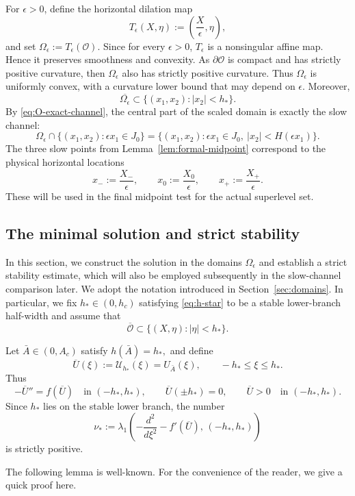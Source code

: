\documentclass[reqno,12pt]{amsart}
\numberwithin{equation}{section}
\theoremstyle{remark}
\begin{document}
For $\epsilon>0$, define the horizontal dilation map
$$
T_\epsilon(X,\eta):=\left(\frac{X}{\epsilon},\eta\right),
$$
and set $\Omega_\epsilon:=T_\epsilon(\mathcal O).$
Since for every $\epsilon>0$, $T_\epsilon$ is a nonsingular affine map. Hence it preserves smoothness and  convexity. As $\partial \mathcal O$ is compact and has strictly positive curvature, then $\Omega_\epsilon$ also has strictly positive curvature. Thus $\Omega_\epsilon$ is uniformly convex, with a curvature lower bound that may depend on $\epsilon$. 
Moreover,
$$
\overline{\Omega_\epsilon}
\subset
\{(x_1,x_2): |x_2|<h_*\}.
$$
By \eqref{eq:O-exact-channel}, the central part of the scaled domain is exactly the slow channel:
$$
\Omega_\epsilon\cap\{(x_1,x_2):\epsilon x_1\in J_0\}
=\{(x_1,x_2):\epsilon x_1\in J_0,\ |x_2|<H(\epsilon x_1)\}.
$$
The three slow points from Lemma~\ref{lem:formal-midpoint} correspond to the
physical horizontal locations
$$
x_-:=\frac{X_-}{\epsilon}, \qquad
x_0:=\frac{X_0}{\epsilon}, \qquad
x_+:=\frac{X_+}{\epsilon}.
$$
These will be used in the final midpoint test for the actual superlevel set.


\subsection{The minimal solution and strict stability}\label{sec:solution-stability}

In this section, we construct the solution in the domains
$\Omega_\epsilon$ and establish a strict stability estimate, which will also be
employed subsequently in the slow-channel comparison later. We adopt the notation introduced in Section~\ref{sec:domains}. In particular, we fix $h_*\in(0,h_c)$ satisfying \eqref{eq:h-star} to be a stable lower-branch
half-width  and assume that
$$
\overline{\mathcal O}\subset \{(X,\eta): |\eta|<h_*\}.
$$


Let $\bar A\in(0,A_c)$ satisfy $h(\bar A)=h_*,$
and define
$$
\overline U(\xi):=\mathcal U_{h_*}(\xi)=U_{\bar A}(\xi),
\qquad -h_*\le \xi\le h_*.
$$
Thus
$$
-\overline U''=f(\overline U)\quad\text{in }(-h_*,h_*),
\qquad
\overline U(\pm h_*)=0,
\qquad
\overline U>0\quad\text{in }(-h_*,h_*).
$$
Since $h_*$ lies on the stable lower branch, the number
\begin{equation}\label{eq:defn-mu-star}
    \nu_*:=\lambda_1\left(-\frac{d^2}{d\xi^2}-f'(\overline U),\,(-h_*,h_*)\right)
\end{equation}
is strictly positive.

The following lemma is well-known. For the convenience of the reader, we give a quick proof here. 
\end{document}
